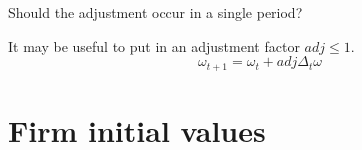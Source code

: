 Should the adjustment occur in a single period?

It may be useful to put in an adjustment factor $adj \le 1$.
\[\omega_{t+1}=\omega_{t} + adj \Delta_t  \omega\]







\section{Firm initial values}

